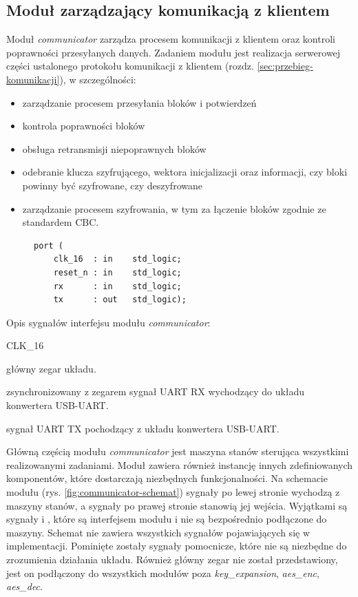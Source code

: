 \subsection{Moduł zarządzający komunikacją z klientem}
\label{sec:comminicator}
Moduł \textit{communicator} zarządza procesem komunikacji z klientem oraz kontroli poprawności przesyłanych danych. Zadaniem modułu jest realizacja serwerowej części ustalonego protokołu komunikacji z klientem (rozdz. \ref{sec:przebieg-komunikacji}), w szczególności:
\begin{itemize}[noitemsep, nolistsep]
\item zarządzanie procesem przesyłania bloków i potwierdzeń
\item kontrola poprawności bloków
\item obsługa retransmisji niepoprawnych bloków
\item odebranie klucza szyfrującego, wektora inicjalizacji oraz informacji, czy bloki powinny być szyfrowane, czy deszyfrowane
\item zarządzanie procesem szyfrowania, w tym za łączenie bloków zgodnie ze standardem CBC.
\end{itemize}

\begin{figure}[!h]
\begin{lstlisting}[style=vhdl, captionpos=b, caption={\textit{communicator} -- interfejs modułu}]
port (
	clk_16  : in    std_logic;
	reset_n : in    std_logic;
	rx      : in    std_logic;
	tx      : out   std_logic);
\end{lstlisting}
\end{figure}

Opis sygnałów interfejsu modułu \textit{communicator}:
\begin{interface}{CLK\_16}
	\item[\insignal{CLK\_16}] główny zegar układu.
	\item[\insignal{RX}] zsynchronizowany z zegarem  sygnał UART RX wychodzący do układu konwertera USB-UART.
	\item[\outsignal{TX}] sygnał UART TX pochodzący z układu konwertera USB-UART.
\end{interface}

Główną częścią modułu \textit{communicator} jest maszyna stanów sterująca wszystkimi realizowanymi zadaniami. Moduł zawiera również instancję innych zdefiniowanych komponentów, które dostarczają niezbędnych funkcjonalności. Na schemacie modułu (rys. \ref{fig:communicator-schemat}) sygnały po lewej stronie wychodzą z maszyny stanów, a sygnały po prawej stronie stanowią jej wejścia. Wyjątkami są sygnały  i , które są interfejsem modułu i nie są bezpośrednio podłączone do maszyny. Schemat nie zawiera wszystkich sygnałów pojawiających się w implementacji. Pominięte zostały sygnały pomocnicze, które nie są niezbędne do zrozumienia działania układu. Również główny zegar nie został przedstawiony, jest on podłączony do wszystkich modułów poza \textit{key\_expansion}, \textit{aes\_enc}, \textit{aes\_dec}.


